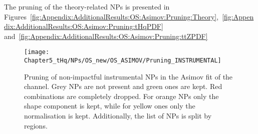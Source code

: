 The pruning of the theory-related NPs is presented in 
Figures~\ref{fig:Appendix:AdditionalResults:OS:Asimov:Pruning:Theory},~\ref{fig:Appendix:AdditionalResults:OS:Asimov:Pruning:tHqPDF} 
and~\ref{fig:Appendix:AdditionalResults:OS:Asimov:Pruning:ttZPDF}


\begin{comment}
In the SR and CR(\ttbar) the \tHq PDF NPs are kept in most of cases either in shape or normalisation,
this is due to the density of \tHq events in these two regions. Meanwhile, for the CR(\Zjets) this is not
the case where either shape or the entire NP is dropped, as
Figure~\ref{fig:Appendix:AdditionalResults:OS:Asimov:Pruning:tHqPDF} illustrates.

Regarding the modelling, as Figure~\ref{fig:Appendix:AdditionalResults:OS:Asimov:Pruning:ttWPDF}
shows, the normalisation of NPs of the PDFs of the \ttW process are kept in the SR and
the CR(\ttbar) but both normalisation and shape are impactful in the CR(\Zjets). For \tZq PDFs,
Figure~\ref{fig:Appendix:AdditionalResults:OS:Asimov:Pruning:tZqPDF} manifests how
the related NPs are mostly dropped. The shape of the NPs for the PDFs of the \ttH process 
is dropped in all cases as Figure~\ref{fig:Appendix:AdditionalResults:OS:Asimov:Pruning:ttHPDF}
exhibits. With \ttZ PDFs, in Figure~\ref{fig:Appendix:AdditionalResults:OS:Asimov:Pruning:ttZPDF},
there is a similar behaviour as for \tZq.

For \ttbar, the most important background this channel, all except one NPs related to its PDFs are dropped as
Figure~\ref{fig:Appendix:AdditionalResults:OS:Asimov:Pruning:ttbarPDF} shows. Finally, for the
diboson PDFs, the shape of its NPs is dropped most of times (see 
Figure~\ref{fig:Appendix:AdditionalResults:OS:Asimov:Pruning:DibosonPDF}).
\end{comment}


\begin{figure}[h]
  \centering
  \texttt{[image: Chapter5\_tHq/NPs/OS\_new/OS\_ASIMOV/Pruning\_INSTRUMENTAL]}	
   \caption{Pruning of non-impactful instrumental NPs in the Asimov fit of the \dilepOStau channel. Grey NPs are 
   not present and green ones are kept. Red combinations are completely dropped. For orange NPs only the shape 
   component is kept, while for yellow ones only the normalisation is kept. Additionally, the list of NPs is split by regions.}
  \label{fig:Appendix:AdditionalResults:OS:Asimov:Pruning:instrumental_general}
\end{figure}


